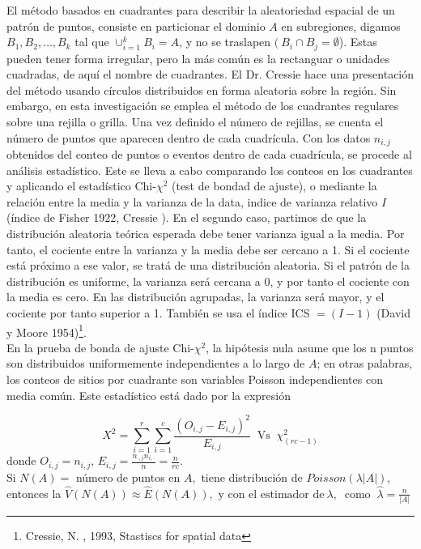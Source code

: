 \documentclass[12pt]{report}
\begin{document}
		El método basados en cuadrantes para describir la aleatoriedad espacial de un patrón de puntos, consiste en particionar el dominio $ A$ en subregiones, digamos $ B_{1}, B_{2},\dots , B_{k} $ tal que  $  \cup_{i=1}^{k}  B_{i}  =  A$, y no se traslapen  $( \: B_{i} \cap B_{j} = \emptyset$). Estas pueden tener forma irregular, pero la más común es la rectanguar o unidades cuadradas, de aquí el nombre de cuadrantes. El Dr. Cressie hace una presentación del método usando  círculos  distribuidos en forma aleatoria sobre la región. Sin embargo, en esta investigación se emplea  el método de los cuadrantes regulares sobre una rejilla o grilla. Una vez definido el número de rejillas, se cuenta el número de puntos que aparecen dentro de cada cuadrícula. Con los datos $n_{i, j}$ obtenidos del conteo de puntos o eventos dentro de cada cuadrícula, se procede al análisis estadístico. Este se lleva a cabo comparando los conteos en los cuadrantes y aplicando el estadístico Chi-$\chi^{2}$ (test de bondad de ajuste),  o mediante la relación entre la media y la varianza de la data, indice de varianza relativo $I$ (índice de Fisher 1922, Cressie \cite{Cress}). En el segundo caso, partimos de que la distribución aleatoria teórica esperada debe tener varianza igual a la media. Por tanto, el cociente entre la varianza y la media debe ser cercano a 1. Si el cociente está próximo a ese valor, se tratá de una distribución aleatoria. Si el patrón de la distribución es uniforme, la varianza  será cercana a 0, y por tanto el cociente con la media es cero. En las distribución agrupadas, la varianza será mayor, y el cociente por tanto superior a 1. También se usa el índice  ICS $ = (I - 1)$ (David y Moore  1954){\footnote{Cressie, N. , 1993, Stastiscs for spatial data}}.\\
		
		En la prueba de bonda de ajuste Chi-$\chi^{2}$, la hipótesis nula asume que los n puntos son distribuidos uniformemente independientes a lo largo de $A$; en otras palabras, los conteos de sitios por cuadrante son variables Poisson independientes con media común.
		Este estadístico  está dado por la expresión
		
		
		\[ X^{2} =\sum_{i=1}^{r} \sum_{i=1}^{c}  \frac{(O_{i, j} - E_{i, j})^{2} }{ E_{i, j} } \: \text{ Vs } \: \chi^{2 }_{(r c -1)} \] donde $O_{i, j} = n_{i, j } $,  	 $ E_{i, j} = \frac{n_{\cdot,j} n_{i,\cdot}}{n} = \frac{n}{rc} .$\\ 
		
		Si  $N(A) =  $ número de puntos en  $A,$ tiene distribución de $ Poisson(\lambda|A|)$, entonces la  $ \widehat{ V}(N(A)) \approx \widehat{E}(N(A)),  \text{ y con el estimador de} \: \lambda, \: $ como $ \: \widehat{\lambda} = \frac{n}{|A|} $
		
\end{document}
